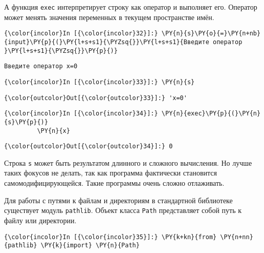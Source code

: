     А функция \texttt{exec} интерпретирует строку как оператор и выполняет
его. Оператор может менять значения переменных в текущем пространстве
имён.

    \begin{Verbatim}[commandchars=\\\{\}]
{\color{incolor}In [{\color{incolor}32}]:} \PY{n}{s}\PY{o}{=}\PY{n+nb}{input}\PY{p}{(}\PY{l+s+s1}{\PYZsq{}}\PY{l+s+s1}{Введите оператор }\PY{l+s+s1}{\PYZsq{}}\PY{p}{)}
\end{Verbatim}

    \begin{Verbatim}[commandchars=\\\{\}]
Введите оператор x=0

    \end{Verbatim}

    \begin{Verbatim}[commandchars=\\\{\}]
{\color{incolor}In [{\color{incolor}33}]:} \PY{n}{s}
\end{Verbatim}

            \begin{Verbatim}[commandchars=\\\{\}]
{\color{outcolor}Out[{\color{outcolor}33}]:} 'x=0'
\end{Verbatim}
        
    \begin{Verbatim}[commandchars=\\\{\}]
{\color{incolor}In [{\color{incolor}34}]:} \PY{n}{exec}\PY{p}{(}\PY{n}{s}\PY{p}{)}
         \PY{n}{x}
\end{Verbatim}

            \begin{Verbatim}[commandchars=\\\{\}]
{\color{outcolor}Out[{\color{outcolor}34}]:} 0
\end{Verbatim}
        
    Строка \texttt{s} может быть результатом длинного и сложного вычисления.
Но лучше таких фокусов не делать, так как программа фактически
становится самомодифицирующейся. Такие программы очень сложно
отлаживать.

Для работы с путями к файлам и директориям в стандартной библиотеке
существует модуль \texttt{pathlib}. Объект класса \texttt{Path}
представляет собой путь к файлу или директории.

    \begin{Verbatim}[commandchars=\\\{\}]
{\color{incolor}In [{\color{incolor}35}]:} \PY{k+kn}{from} \PY{n+nn}{pathlib} \PY{k}{import} \PY{n}{Path}
\end{Verbatim}


